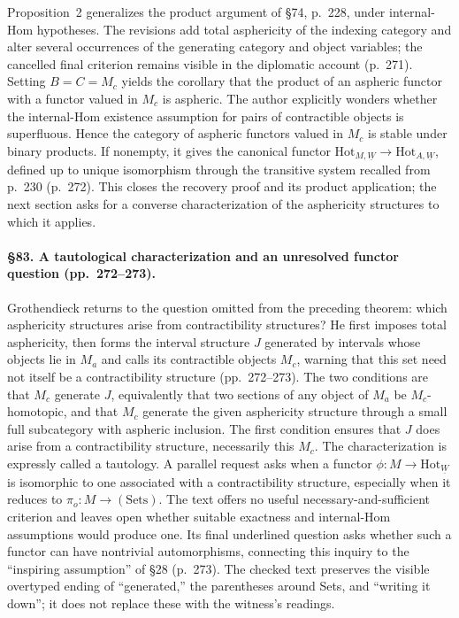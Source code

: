 Proposition~2 generalizes the product argument of \S74, p.\ 228, under internal-Hom hypotheses. The revisions add total asphericity of the indexing category and alter several occurrences of the generating category and object variables; the cancelled final criterion remains visible in the diplomatic account (p.\ 271). Setting $B=C=M_c$ yields the corollary that the product of an aspheric functor with a functor valued in $M_c$ is aspheric. The author explicitly wonders whether the internal-Hom existence assumption for pairs of contractible objects is superfluous. Hence the category of aspheric functors valued in $M_c$ is stable under binary products. If nonempty, it gives the canonical functor $\mathrm{Hot}_{M,\underline W}\to\mathrm{Hot}_{A,\underline W}$, defined up to unique isomorphism through the transitive system recalled from p.\ 230 (p.\ 272). This closes the recovery proof and its product application; the next section asks for a converse characterization of the asphericity structures to which it applies.

\paragraph{\S83. A tautological characterization and an unresolved functor question (pp.\ 272--273).}
Grothendieck returns to the question omitted from the preceding theorem: which asphericity structures arise from contractibility structures? He first imposes total asphericity, then forms the interval structure $J$ generated by intervals whose objects lie in $M_a$ and calls its contractible objects $M_c$, warning that this set need not itself be a contractibility structure (pp.\ 272--273). The two conditions are that $M_c$ generate $J$, equivalently that two sections of any object of $M_a$ be $M_c$-homotopic, and that $M_c$ generate the given asphericity structure through a small full subcategory with aspheric inclusion. The first condition ensures that $J$ does arise from a contractibility structure, necessarily this $M_c$. The characterization is expressly called a tautology. A parallel request asks when a functor $\phi:M\to\mathrm{Hot}_{\underline W}$ is isomorphic to one associated with a contractibility structure, especially when it reduces to $\pi_o:M\to(\mathrm{Sets})$. The text offers no useful necessary-and-sufficient criterion and leaves open whether suitable exactness and internal-Hom assumptions would produce one. Its final underlined question asks whether such a functor can have nontrivial automorphisms, connecting this inquiry to the “inspiring assumption” of \S28 (p.\ 273). The checked text preserves the visible overtyped ending of “generated,” the parentheses around Sets, and “writing it down”; it does not replace these with the witness's readings.


